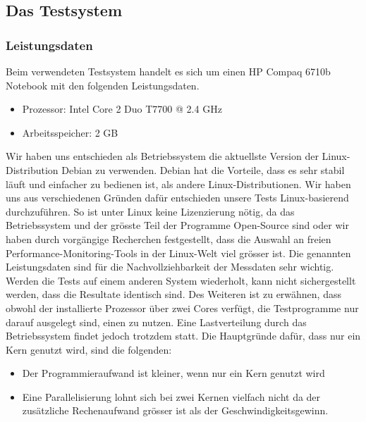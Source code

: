 \documentclass{fancydocument}
\begin{document}
\subsection{Das Testsystem}
\subsubsection{Leistungsdaten}
Beim verwendeten Testsystem  handelt es sich um einen HP Compaq 6710b Notebook mit den folgenden Leistungsdaten.

\begin{itemize}
\item Prozessor: Intel Core 2 Duo T7700 @ 2.4 GHz
\item Arbeitsspeicher: 2 GB
\end{itemize}

Wir haben uns entschieden als Betriebssystem die aktuellste Version der Linux-Distribution Debian zu verwenden. Debian hat die Vorteile, dass es sehr stabil läuft und einfacher zu bedienen ist, als andere Linux-Distributionen. Wir haben uns aus verschiedenen Gründen dafür entschieden unsere Tests Linux-basierend durchzuführen. So ist unter Linux keine Lizenzierung nötig, da das Betriebssystem und der grösste Teil der Programme Open-Source sind  oder  wir haben durch vorgängige Recherchen festgestellt, dass die Auswahl an freien Performance-Monitoring-Tools in der Linux-Welt viel grösser ist.
Die genannten Leistungsdaten sind für die Nachvollziehbarkeit der Messdaten sehr wichtig. Werden die Tests auf einem anderen System wiederholt, kann nicht sichergestellt werden, dass die Resultate identisch sind. 
Des Weiteren ist zu erwähnen, dass obwohl der installierte Prozessor über zwei Cores verfügt, die Testprogramme nur darauf ausgelegt sind, einen zu nutzen. Eine Lastverteilung durch das Betriebssystem findet jedoch trotzdem statt. Die Hauptgründe dafür, dass nur ein Kern genutzt wird, sind die folgenden:

\begin{itemize}
\item Der Programmieraufwand ist kleiner, wenn nur ein Kern genutzt wird
\item Eine Parallelisierung lohnt sich bei zwei Kernen vielfach nicht da der zusätzliche Rechenaufwand grösser ist als der Geschwindigkeitsgewinn.
\end{itemize}
\end{document}
